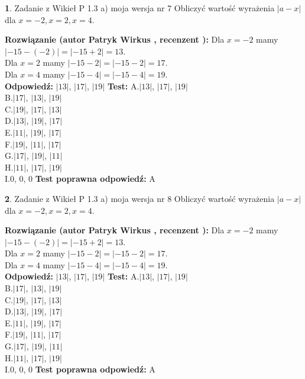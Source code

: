 \documentclass[12pt, a4paper]{article}
\theoremstyle{definition} %
\newtheorem{zad}{}
\newcommand{\zadStart}[1]{\begin{zad}#1\newline}
\newcommand{\zadStop}{\end{zad}}
\newcommand{\rozwStart}[2]{\noindent \textbf{Rozwiązanie (autor #1 , recenzent #2): }\newline}
\newcommand{\rozwStop}{\newline}
\newcommand{\odpStart}{\noindent \textbf{Odpowiedź:}\newline}
\newcommand{\odpStop}{\newline}
\newcommand{\testStart}{\noindent \textbf{Test:}\newline}
\newcommand{\testStop}{\newline}
\newcommand{\kluczStart}{\noindent \textbf{Test poprawna odpowiedź:}\newline}
\newcommand{\kluczStop}{\newline}
\begin{document}
\zadStart{Zadanie z Wikieł P 1.3 a) moja wersja nr 7}
Obliczyć wartość wyrażenia $|a - x|$ dla $x=-2,x=2,x=4$.
\zadStop
\rozwStart{Patryk Wirkus}{}
Dla $x = -2$ mamy $|-15 - (-2)| = |-15 + 2| = 13$.\\
Dla $x = 2$ mamy $|-15 - 2| = |-15 - 2| = 17$.\\
Dla $x = 4$ mamy $|-15 - 4| = |-15 - 4| = 19$.\\
\rozwStop
\odpStart
$|13|$, $|17|$, $|19|$
\odpStop
\testStart
A.$|13|$, $|17|$, $|19|$\\
B.$|17|$, $|13|$, $|19|$\\
C.$|19|$, $|17|$, $|13|$\\
D.$|13|$, $|19|$, $|17|$\\
E.$|11|$, $|19|$, $|17|$\\
F.$|19|$, $|11|$, $|17|$\\
G.$|17|$, $|19|$, $|11|$\\
H.$|11|$, $|17|$, $|19|$\\
I.$0$, $0$, $0$
\testStop
\kluczStart
A
\kluczStop



\zadStart{Zadanie z Wikieł P 1.3 a) moja wersja nr 8}
Obliczyć wartość wyrażenia $|a - x|$ dla $x=-2,x=2,x=4$.
\zadStop
\rozwStart{Patryk Wirkus}{}
Dla $x = -2$ mamy $|-15 - (-2)| = |-15 + 2| = 13$.\\
Dla $x = 2$ mamy $|-15 - 2| = |-15 - 2| = 17$.\\
Dla $x = 4$ mamy $|-15 - 4| = |-15 - 4| = 19$.\\
\rozwStop
\odpStart
$|13|$, $|17|$, $|19|$
\odpStop
\testStart
A.$|13|$, $|17|$, $|19|$\\
B.$|17|$, $|13|$, $|19|$\\
C.$|19|$, $|17|$, $|13|$\\
D.$|13|$, $|19|$, $|17|$\\
E.$|11|$, $|19|$, $|17|$\\
F.$|19|$, $|11|$, $|17|$\\
G.$|17|$, $|19|$, $|11|$\\
H.$|11|$, $|17|$, $|19|$\\
I.$0$, $0$, $0$
\testStop
\kluczStart
A
\kluczStop
\end{document}

